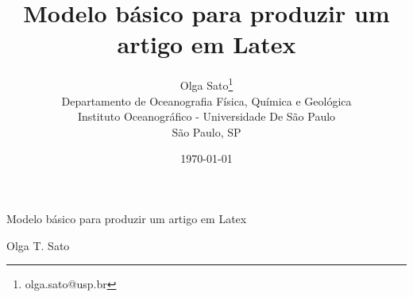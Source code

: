 \documentclass[pdftex,12pt,a4paper]{article} %
\begin{document}
\pagestyle{empty}

\title{\Large Modelo básico para produzir um artigo em Latex}
\author{\large Olga Sato\thanks{olga.sato@usp.br} \hspace{.25cm} \\
Departamento de Oceanografia Física, Química e Geológica \\
Instituto Oceanogr\'afico - Universidade De S\~ao Paulo\\
São Paulo, SP}
\date{\today}
\thispagestyle{empty}
\maketitle
\normalsize

%
\newpage


\begin{center}
{\Large Modelo básico para produzir um artigo em Latex}
\end{center}

\vspace{-.25in}
\noindent\hrulefill

\vspace{.5in}

\centerline{\large Olga T. Sato}
\end{document}
